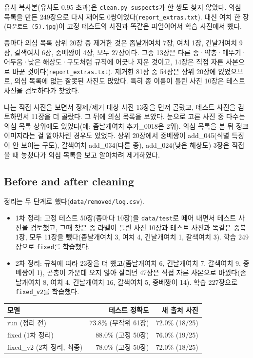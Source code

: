 \documentclass[11pt]{article}
\begin{document}
유사 복사본(유사도 0.95 초과)은 \texttt{clean.py suspects}가 한 쌍도 찾지 않았다. 의심 목록을 만든 249장으로 다시 재어도 0쌍이었다(\texttt{report\_extras.txt}). 대신 여치 한 장(\texttt{다운로드 (5).jpg})이 고정 테스트의 사진과 똑같은 파일이어서 학습 사진에서 뺐다.

종마다 의심 목록 상위 20장 중 제거한 것은 좀날개여치 7장, 여치 1장, 긴날개여치 9장, 갈색여치 6장, 중베짱이 4장, 모두 27장이다. 그중 13장은 다른 종·약충·메뚜기·어두움·낮은 해상도·구도처럼 규칙에 어긋나 지운 것이고, 14장은 직접 자른 사본으로 바꾼 것이다(\texttt{report\_extras.txt}). 제거한 81장 중 54장은 상위 20장에 없었으므로, 의심 목록에 없는 잘못된 사진도 많았다. 특히 종 이름이 틀린 사진 10장은 테스트 사진을 검토하다가 찾았다.

나는 직접 사진을 보면서 정제/제거 대상 사진 13장을 먼저 골랐고, 테스트 사진을 검토하면서 11장을 더 골랐다. 그 뒤에 의심 목록을 보았다. 눈으로 고른 사진 중 다수는 의심 목록 상위에도 있었다(예: 좀날개여치 추가\_0018은 2위). 의심 목록을 본 뒤 정크 이미지라는 걸 알아차린 경우도 있었다. 상위 20장에서 중베짱이 add\_045(식별 특징이 안 보이는 구도), 갈색여치 add\_034(다른 종), add\_024(낮은 해상도) 3장은 직접 볼 때 놓쳤다가 의심 목록을 보고 알아차려 제거하였다.

\subsection*{Before and after cleaning}
정리는 두 단계로 했다(\texttt{data/removed/log.csv}).
\begin{itemize}
\item 1차 정리: 고정 테스트 50장(종마다 10장)을 \texttt{data/test}로 떼어 내면서 테스트 사진을 검토했고, 그때 찾은 종 라벨이 틀린 사진 10장과 테스트 사진과 똑같은 중복 1장, 모두 11장을 뺐다(좀날개여치 3, 여치 4, 긴날개여치 1, 갈색여치 3). 학습 249장으로 \texttt{fixed}를 학습했다.
\item 2차 정리: 규칙에 따라 23장을 더 뺐고(좀날개여치 6, 긴날개여치 7, 갈색여치 9, 중베짱이 1), 곤충이 가운데 오지 않아 잘리던 47장은 직접 자른 사본으로 바꿨다(좀날개여치 8, 여치 4, 긴날개여치 16, 갈색여치 5, 중베짱이 14). 학습 227장으로 \texttt{fixed\_v2}를 학습했다.
\end{itemize}


\begin{center}\footnotesize
\begin{tabular}{lrr}
\toprule
모델 & 테스트 정확도 & 새 출처 사진 \\
\midrule
run (정리 전) & 73.8\% (무작위 61장) & 72.0\% (18/25) \\
fixed (1차 정리) & 88.0\% (고정 50장) & 76.0\% (19/25) \\
fixed\_v2 (2차 정리, 최종) & 78.0\% (고정 50장) & 72.0\% (18/25) \\
\bottomrule
\end{tabular}
\end{center}
\end{document}
